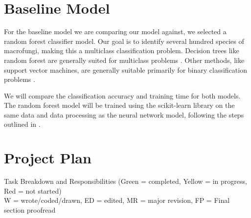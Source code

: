 \documentclass{article} %
\begin{document}
\section{Baseline Model}
For the baseline model we are comparing our model against, we selected a random forest classifier model. Our goal is to identify several hundred species of macrofungi, making this a multiclass classification problem. Decision trees like random forest are generally suited for multiclass problems \citep{GallRazaviEtAl.IntroductionRandomForests.2012}. Other methods, like support vector machines, are generally suitable primarily for binary classification problems \citep{JamesWittenEtAl.IntroductionStatisticalLearning.2023}. 

We will compare the classification accuracy and training time for both models. The random forest model will be trained using the scikit-learn library on the same data and data processing as the neural network model, following the steps outlined in \cite{Shafl.RandomForestClassification.2023}.

\section{Project Plan}
Task Breakdown and Responsibilities (Green = completed, Yellow = in progress, Red = not started)\\
W = wrote/coded/drawn, ED = edited, MR = major revision, FP = Final section proofread
\end{document}
